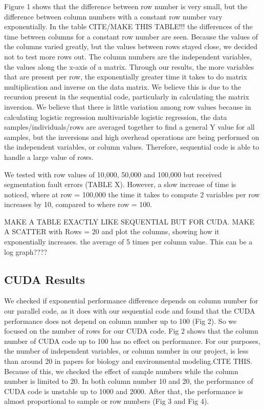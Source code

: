 \documentclass[letterpaper, 10 pt, conference]{ieeeconf}  %
\begin{document}
Figure 1 shows that the difference between row number is very small, but the difference between column numbers with a constant row number vary exponentially. In the table CITE/MAKE THIS TABLE!!! the differences of the time between columns for a constant row number are seen. Because the values of the columns varied greatly, but the values between rows stayed close, we decided not to test more rows out. The column numbers are the independent variables, the values along the x-axis of a matrix. Through our results, the more variables that are present per row, the exponentially greater time it takes to do matrix multiplication and inverse on the data matrix. We believe this is due to the recursion present in the sequential code, particularly in calculating the matrix inversion. We believe that there is little variation among row values because in calculating logistic regression multivariable logistic regression, the data samples/individuals/rows are averaged together to find a general Y value for all samples, but the inversions and high overhead operations are being performed on the independent variables, or column values. Therefore, sequential code is able to handle a large value of rows. 

We tested with row values of 10,000, 50,000 and 100,000 but received segmentation fault errors (TABLE X). However, a slow increase of time is noticed, where at row = 100,000 the time it takes to compute 2 variables per row increases by 10, compared to where row = 100. 

MAKE A TABLE EXACTLY LIKE SEQUENTIAL BUT FOR CUDA. MAKE A SCATTER with Rows = 20 and plot the columns, showing how it exponentially increases. the average of 5 times per column value. This can be a log graph????


\subsection{CUDA Results}

We checked if exponential performance difference depends on column number for our parallel code, as it does with our sequential code and found that the CUDA performance does not depend on column number up to 100 (Fig 2). So we focused on the number of rows for our CUDA code. Fig 2 shows that the column number of CUDA code up to 100 has no effect on performance. For our purposes, the number of independent variables, or column number in our project, is less than around 20 in papers for biology and environmental modeling.CITE THIS. Because of this, we checked the effect of sample numbers while the column number is limited to 20. In both column number 10 and 20, the performance of CUDA code is unstable up to 1000 and 2000. After that, the performance is almost proportional to sample or row numbers (Fig 3 and Fig 4).
\end{document}
